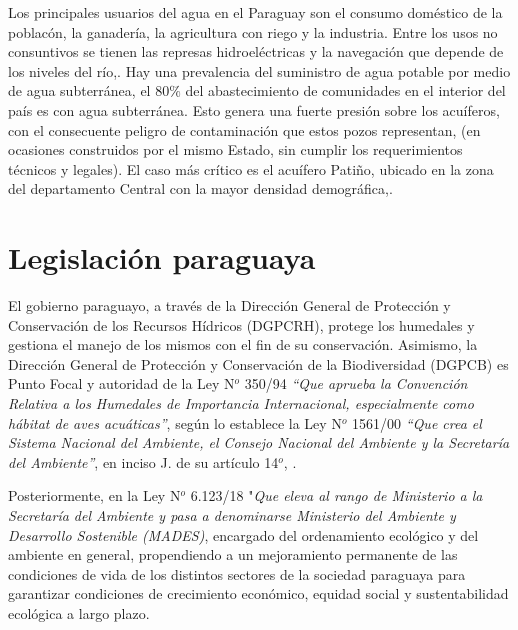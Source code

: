 Los principales usuarios del agua en el Paraguay son el consumo dom\'estico de la poblac\'on, la ganader\'ia, la agricultura con riego y la industria. 
Entre los usos no consuntivos se tienen las represas hidroel\'ectricas y la navegaci\'on que depende de los niveles del r\'io,\cite{groundwater_caracteristicas_2021}.
Hay una prevalencia del suministro de agua potable por medio de agua subterr\'anea, el 80$\%$ del abastecimiento de comunidades en el interior del pa\'is es con agua subterr\'anea. Esto genera una fuerte presi\'on sobre los acu\'iferos, con el consecuente peligro de contaminaci\'on que estos pozos representan, (en ocasiones construidos por el mismo Estado, sin cumplir los requerimientos t\'ecnicos y legales). El caso m\'as cr\'itico es el acu\'ifero Pati\~no, ubicado en la zona del departamento Central con la mayor densidad demogr\'afica,\cite{alvarez-2014}.


\section{Legislaci\'on paraguaya}

El gobierno paraguayo, a trav\'es de la Direcci\'on General de Protecci\'on y Conservaci\'on de los Recursos H\'idricos (DGPCRH), protege los humedales y gestiona el manejo de los mismos con el fin de su conservaci\'on. Asimismo, la Direcci\'on General de Protecci\'on y Conservaci\'on de la Biodiversidad (DGPCB) es Punto Focal y autoridad de la Ley N$^{o}$ 350/94 \textit{“Que aprueba la Convenci\'on Relativa a los Humedales de Importancia Internacional, especialmente como h\'abitat de aves acu\'aticas”}, seg\'un lo establece la Ley N$^{o}$ 1561/00 \textit{“Que crea el Sistema Nacional del Ambiente, el Consejo Nacional del Ambiente y la Secretar\'ia del Ambiente”}, en inciso J. de su art\'iculo 14$^{o}$, \cite{direccion_general_de_proteccion_y_sitios_nodate}. 

Posteriormente, en la Ley N$^{o}$ 6.123/18 "\textit{Que eleva al rango de Ministerio a la Secretar\'ia del Ambiente y pasa a denominarse Ministerio del Ambiente y Desarrollo Sostenible (MADES)}, encargado del ordenamiento ecol\'ogico y del ambiente en general, propendiendo a un mejoramiento permanente de las condiciones de vida de los distintos sectores de la sociedad paraguaya para garantizar condiciones de crecimiento econ\'omico, equidad social y sustentabilidad ecol\'ogica a largo plazo. 

